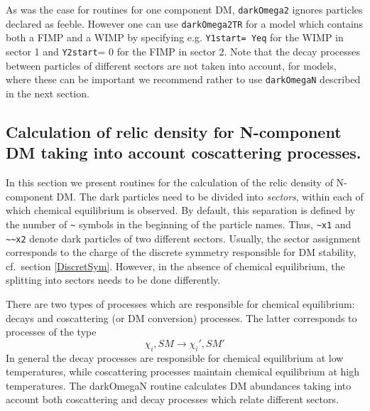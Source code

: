 \documentclass[12pt,a4paper]{article}
\begin{document}
As was the case for routines for  one  component DM, {\tt darkOmega2}  ignores particles declared as feeble. However one can use \verb|darkOmega2TR| for a model which contains both a FIMP and a WIMP by  specifying e.g. {\tt Y1start= Yeq} for the WIMP in sector 1 and {\tt Y2start}= 0 for the  FIMP in sector 2. Note that the decay processes between particles of different sectors are not taken into account,  for
models, where these can be important we recommend rather to use \verb|darkOmegaN| described in the next section.
 



\subsection{Calculation of relic density  for N-component DM  taking into account   coscattering processes.}

\label{sec:N}



In this section we present routines for the calculation of the relic density  of N-component DM. The dark particles  need to be divided into \emph{sectors}, within each of which chemical equilibrium is  observed.  
By default, this separation is defined by the number of \verb|~| symbols in the beginning of the 
particle names. Thus, \verb|~x1| and \verb|~~x2| denote dark particles of two different sectors. 
Usually, the sector assignment corresponds to the charge of the discrete symmetry responsible 
for DM stability, cf.\ section \ref{DiscretSym}. 
However, in the absence of chemical equilibrium, the splitting into sectors needs to be done differently. 

 There are two types of processes which are
responsible for chemical equilibrium: decays and coscattering (or DM conversion) processes. The latter
corresponds to  processes of the type 
\begin{equation}
    \chi_i, SM \to \chi_i',SM'
\end{equation}
In general the decay processes are responsible for chemical equilibrium at low
temperatures, while  coscattering processes  maintain chemical equilibrium  at high temperatures. 
The darkOmegaN routine calculates DM abundances taking into account both coscattering and decay processes
which relate different sectors.
\end{document}

